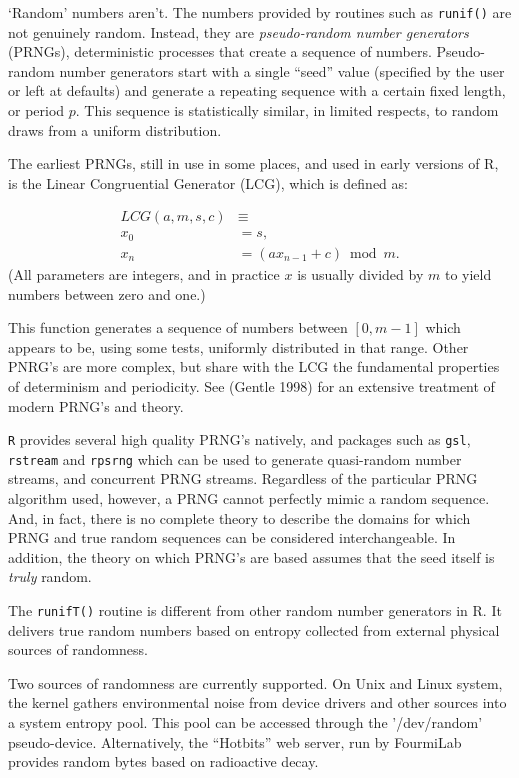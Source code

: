 \documentclass[11pt]{article}
\begin{document}
`Random' numbers aren't.  The numbers provided by routines such as \texttt{runif()} are not genuinely random.
 Instead, they are \emph{pseudo-random number generators}
(PRNGs), deterministic processes that create a sequence of numbers. 
Pseudo-random number generators start with a single ``seed'' value (specified by the user or left at defaults)
 and generate a repeating sequence with a certain
fixed length, or  period $p$. This sequence is statistically
similar, in limited respects, to random draws from a uniform
distribution.

The earliest PRNGs, still in use in some places, and used in early versions of R, is the Linear Congruential Generator (LCG), 
which is defined as:

\begin{align}\label{Congruential.Generator}
    LCG(a,m,s,c)&\equiv \nonumber\\
            x_{0} &=s,  \nonumber\\
            x_{n} &=(ax_{n-1}+c)\bmod{m}.
\end{align}
(All parameters are integers, and in practice $x$ is usually divided by $m$ to yield numbers between zero and one.) 

This function  generates a sequence of numbers between $[0,m-1]$ which appears to be, using some tests, uniformly distributed in that range.  Other PNRG's are more complex, but share with the LCG the  fundamental properties of determinism and periodicity.  See (Gentle 1998) for an extensive treatment of modern PRNG's and theory.

\texttt{R} provides several high quality PRNG's natively, and packages such as  
\texttt{gsl}, \texttt{rstream} and \texttt{rpsrng} which  can be used to generate
quasi-random number streams, and concurrent  PRNG streams.
Regardless of the particular PRNG algorithm used, however, a PRNG cannot
perfectly mimic a random sequence. And, in fact, there is no complete
theory to describe the domains for which PRNG and true random sequences 
can be considered interchangeable.  In addition, the theory
on which PRNG's are based assumes that the seed itself is \emph{truly} random.

The \texttt{runifT()} routine is different from other random number generators in R. 
It delivers true random numbers based on
entropy collected from external physical sources of randomness.

Two sources of randomness are currently supported. On Unix and Linux system, the kernel gathers environmental noise from 
device drivers and other sources into a system entropy pool.
This pool can be accessed through the '/dev/random' pseudo-device.
Alternatively, the ``Hotbits'' web server, run by FourmiLab provides random bytes based on radioactive decay.
\end{document}
